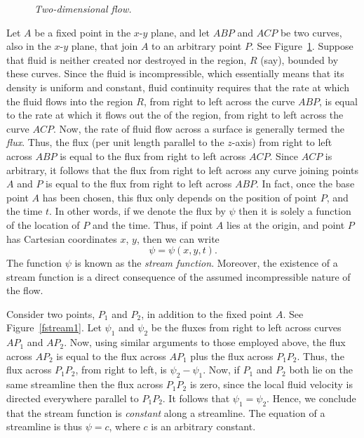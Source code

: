 \begin{figure}
\epsfysize=2.5in
\centerline{}
\caption{\em Two-dimensional flow.}\label{fstream}
\end{figure}

Let $A$ be a fixed point in the $x$-$y$ plane, and let $ABP$ and $ACP$ be two curves, also in the $x$-$y$  plane, 
that join $A$ to an arbitrary point $P$. See Figure~\ref{fstream}. Suppose that fluid is neither created nor destroyed in the region, $R$ (say),  bounded by
these curves. Since the fluid is incompressible, which essentially means that its density is uniform and constant, 
fluid continuity requires that the rate at which the fluid flows into the region $R$, from right to left across the
curve $ABP$, is equal to the rate at which it flows out the of the region, from right to left across the
curve $ACP$. Now, the rate of fluid flow across a surface is generally termed the {\em flux}. Thus, the flux (per unit length parallel to the $z$-axis) from right to left across $ABP$
is equal to the flux from right to left across $ACP$. Since $ACP$ is arbitrary, it follows that the flux from right to left across any curve
joining points $A$ and $P$ is equal to the flux from right to left across $ABP$. In fact, once the base point $A$
has been chosen, this flux only depends on the position of point $P$, and the time $t$. In other words, if we denote the flux by $\psi$ then
it is solely a function of the location of $P$ and the time. Thus, if point $A$ lies at the origin, and point $P$ has Cartesian
coordinates $x$, $y$, then we can write
\begin{equation}
\psi= \psi(x,y,t).
\end{equation}
The function $\psi$ is known as the {\em stream function}. Moreover, the existence of a stream function is a direct consequence of the assumed incompressible nature of the flow. 

Consider two points, $P_1$ and $P_2$, in addition to the fixed point $A$.  See Figure~\ref{fstream1}. Let $\psi_1$ and $\psi_2$ be the fluxes
from right to left across curves $AP_1$ and $AP_2$. Now, using similar arguments to those employed above, the
flux across $AP_2$ is equal to the flux across $AP_1$ plus the flux across $P_1 P_2$. Thus, the
flux across $P_1 P_2$, from right to left, is $\psi_2-\psi_1$. Now, if $P_1$ and $P_2$ both lie on the same streamline
then the flux across $P_1 P_2$ is zero, since the local fluid velocity is directed everywhere parallel to $P_1P_2$. It follows that $\psi_1=\psi_2$. Hence, we conclude that the
stream function is {\em constant}\/ along a streamline. The equation of a streamline is thus $\psi=c$, where $c$
is an arbitrary constant. 

